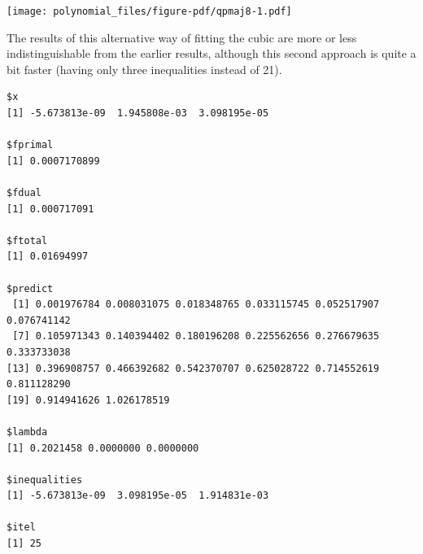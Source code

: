 \documentclass[
  12pt,
  letterpaper,
  DIV=11,
  numbers=noendperiod]{scrreprt}
\newenvironment{Shaded}{\begin{snugshade}}{\end{snugshade}}
\newcommand{\AttributeTok}[1]{\textcolor[rgb]{0.40,0.45,0.13}{#1}}
\newcommand{\ConstantTok}[1]{\textcolor[rgb]{0.56,0.35,0.01}{#1}}
\newcommand{\DecValTok}[1]{\textcolor[rgb]{0.68,0.00,0.00}{#1}}
\newcommand{\FloatTok}[1]{\textcolor[rgb]{0.68,0.00,0.00}{#1}}
\newcommand{\FunctionTok}[1]{\textcolor[rgb]{0.28,0.35,0.67}{#1}}
\newcommand{\NormalTok}[1]{\textcolor[rgb]{0.00,0.23,0.31}{#1}}
\newcommand{\OtherTok}[1]{\textcolor[rgb]{0.00,0.23,0.31}{#1}}
\newcommand{\SpecialCharTok}[1]{\textcolor[rgb]{0.37,0.37,0.37}{#1}}
\newcommand{\StringTok}[1]{\textcolor[rgb]{0.13,0.47,0.30}{#1}}
\theoremstyle{remark}
\begin{document}
\begin{Shaded}
\end{Shaded}

\texttt{[image: polynomial\_files/figure-pdf/qpmaj8-1.pdf]}

The results of this alternative way of fitting the cubic are more or
less indistinguishable from the earlier results, although this second
approach is quite a bit faster (having only three inequalities instead
of 21).

\begin{verbatim}
$x
[1] -5.673813e-09  1.945808e-03  3.098195e-05

$fprimal
[1] 0.0007170899

$fdual
[1] 0.000717091

$ftotal
[1] 0.01694997

$predict
 [1] 0.001976784 0.008031075 0.018348765 0.033115745 0.052517907 0.076741142
 [7] 0.105971343 0.140394402 0.180196208 0.225562656 0.276679635 0.333733038
[13] 0.396908757 0.466392682 0.542370707 0.625028722 0.714552619 0.811128290
[19] 0.914941626 1.026178519

$lambda
[1] 0.2021458 0.0000000 0.0000000

$inequalities
[1] -5.673813e-09  3.098195e-05  1.914831e-03

$itel
[1] 25
\end{verbatim}
\end{document}
